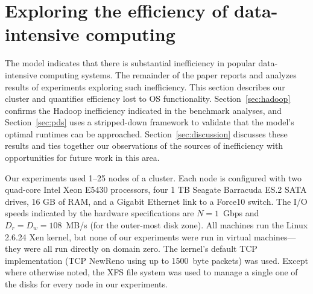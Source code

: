 \section{Exploring the efficiency of data-intensive computing}
\label{sec:measure}

The model indicates that there is substantial inefficiency in popular
data-intensive computing systems.  The remainder of the paper reports
and analyzes results of experiments exploring such inefficiency.  This
section describes our cluster and quantifies efficiency lost to OS
functionality.  Section~\ref{sec:hadoop} confirms the Hadoop
inefficiency indicated in the benchmark analyses, and
Section~\ref{sec:pds} uses a stripped-down framework to validate that
the model's optimal runtimes can be approached.
Section~\ref{sec:discussion} discusses these results and ties together
our observations of the sources of inefficiency with opportunities for
future work in this area.


Our experiments used 1--25 nodes of a cluster.
Each node is configured with two quad-core
Intel Xeon E5430 processors, four 1 TB Seagate Barracuda ES.2 SATA drives,
16 GB of RAM, and a Gigabit Ethernet link to a Force10 switch.
The I/O speeds indicated by the hardware specifications are
$N=1$~Gbps and $D_r = D_w = 108$~MB/s (for the outer-most disk zone).
All machines run the Linux 2.6.24 Xen kernel, but none of our
experiments were run in virtual machines---they were all run directly
on domain zero.
The kernel's default TCP implementation (TCP NewReno using up to 1500~byte
packets) was used.
Except where otherwise noted, the XFS file system was used to manage
a single one of the disks for every node in our experiments.




